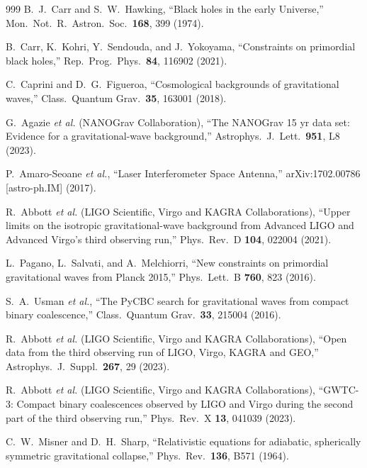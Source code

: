 \documentclass[twocolumn,floatfix,aps,prd,superscriptaddress,nofootinbib]{revtex4-2}
\begin{document}
\begin{thebibliography}{999}
B.~J.~Carr and S.~W.~Hawking,
\newblock ``Black holes in the early Universe,''
\newblock Mon.\ Not.\ R.\ Astron.\ Soc.\ \textbf{168}, 399 (1974).

B.~Carr, K.~Kohri, Y.~Sendouda, and J.~Yokoyama,
\newblock ``Constraints on primordial black holes,''
\newblock Rep.\ Prog.\ Phys.\ \textbf{84}, 116902 (2021).

C.~Caprini and D.~G.~Figueroa,
\newblock ``Cosmological backgrounds of gravitational waves,''
\newblock Class.\ Quantum Grav.\ \textbf{35}, 163001 (2018).

G.~Agazie \emph{et al.} (NANOGrav Collaboration),
\newblock ``The NANOGrav 15 yr data set: Evidence for a gravitational-wave background,''
\newblock Astrophys.\ J.\ Lett.\ \textbf{951}, L8 (2023).

P.~Amaro-Seoane \emph{et al.},
\newblock ``Laser Interferometer Space Antenna,''
\newblock arXiv:1702.00786 [astro-ph.IM] (2017).

R.~Abbott \emph{et al.} (LIGO Scientific, Virgo and KAGRA Collaborations),
\newblock ``Upper limits on the isotropic gravitational-wave background from Advanced LIGO and Advanced Virgo's third observing run,''
\newblock Phys.\ Rev.\ D \textbf{104}, 022004 (2021).

L.~Pagano, L.~Salvati, and A.~Melchiorri,
\newblock ``New constraints on primordial gravitational waves from Planck 2015,''
\newblock Phys.\ Lett.\ B \textbf{760}, 823 (2016).

S.~A.~Usman \emph{et al.},
\newblock ``The PyCBC search for gravitational waves from compact binary coalescence,''
\newblock Class.\ Quantum Grav.\ \textbf{33}, 215004 (2016).

R.~Abbott \emph{et al.} (LIGO Scientific, Virgo and KAGRA Collaborations),
\newblock ``Open data from the third observing run of LIGO, Virgo, KAGRA and GEO,''
\newblock Astrophys.\ J.\ Suppl.\ \textbf{267}, 29 (2023).

R.~Abbott \emph{et al.} (LIGO Scientific, Virgo and KAGRA Collaborations),
\newblock ``GWTC-3: Compact binary coalescences observed by LIGO and Virgo during the second part of the third observing run,''
\newblock Phys.\ Rev.\ X \textbf{13}, 041039 (2023).

C.~W.~Misner and D.~H.~Sharp,
\newblock ``Relativistic equations for adiabatic, spherically symmetric gravitational collapse,''
\newblock Phys.\ Rev.\ \textbf{136}, B571 (1964).


\end{thebibliography}
\end{document}
